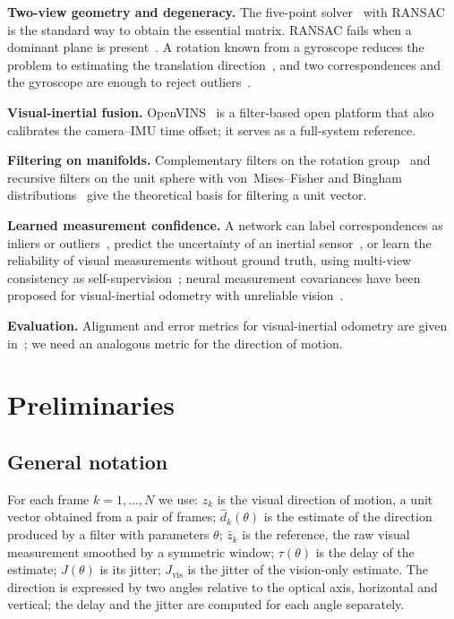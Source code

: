 \documentclass{article}
\begin{document}
\textbf{Two-view geometry and degeneracy.} The five-point solver~\citep{nister2004five} with RANSAC~\citep{fischler1981ransac} is the standard way to obtain the essential matrix. RANSAC fails when a dominant plane is present~\citep{chum2005dominant}. A rotation known from a gyroscope reduces the problem to estimating the translation direction~\citep{kneip2011robust}, and two correspondences and the gyroscope are enough to reject outliers~\citep{troiani2014twopoint}.

\textbf{Visual-inertial fusion.} OpenVINS~\citep{geneva2020openvins} is a filter-based open platform that also calibrates the camera--IMU time offset; it serves as a full-system reference.

\textbf{Filtering on manifolds.} Complementary filters on the rotation group~\citep{mahony2008nonlinear} and recursive filters on the unit sphere with von~Mises--Fisher and Bingham distributions~\citep{kurz2017libdirectional} give the theoretical basis for filtering a unit vector.

\textbf{Learned measurement confidence.} A network can label correspondences as inliers or outliers~\citep{yi2018learning}, predict the uncertainty of an inertial sensor~\citep{qiu2023airimu}, or learn the reliability of visual measurements without ground truth, using multi-view consistency as self-supervision~\citep{choi2025statistical}; neural measurement covariances have been proposed for visual-inertial odometry with unreliable vision~\citep{guo2026lbdu}.

\textbf{Evaluation.} Alignment and error metrics for visual-inertial odometry are given in~\citep{zhang2018tutorial}; we need an analogous metric for the direction of motion.

\section{Preliminaries}\label{sec:prelim}

\subsection{General notation}

For each frame $k=1,\dots,N$ we use: $z_k$ is the visual direction of motion, a unit vector obtained from a pair of frames; $\hat d_k(\theta)$ is the estimate of the direction produced by a filter with parameters $\theta$; $\bar z_k$ is the reference, the raw visual measurement smoothed by a symmetric window; $\tau(\theta)$ is the delay of the estimate; $J(\theta)$ is its jitter; $J_{\mathrm{vis}}$ is the jitter of the vision-only estimate. The direction is expressed by two angles relative to the optical axis, horizontal and vertical; the delay and the jitter are computed for each angle separately.
\end{document}

